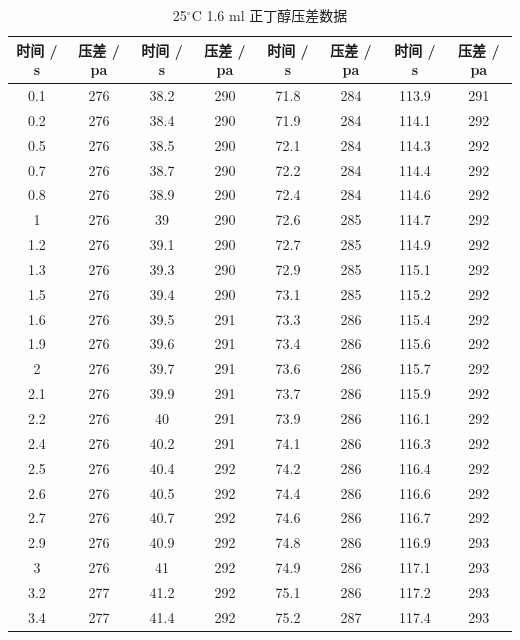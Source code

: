 \documentclass[12pt]{ctexart}
\numberwithin{equation}{section}
\begin{document}
\begin{longtable}{cc|cc|cc|cc}
    \caption{25$^\circ$C  1.6 ml 正丁醇压差数据} \\
    \hline
    时间 / s & 压差 / pa & 时间 / s & 压差 / pa & 时间 / s & 压差 / pa & 时间 / s & 压差 / pa \\
    \hline
    0.1  &  276  &  38.2  &  290  &  71.8  &  284  &  113.9  &  291  \\
0.2  &  276  &  38.4  &  290  &  71.9  &  284  &  114.1  &  292  \\
0.5  &  276  &  38.5  &  290  &  72.1  &  284  &  114.3  &  292  \\
0.7  &  276  &  38.7  &  290  &  72.2  &  284  &  114.4  &  292  \\
0.8  &  276  &  38.9  &  290  &  72.4  &  284  &  114.6  &  292  \\
1  &  276  &  39  &  290  &  72.6  &  285  &  114.7  &  292  \\
1.2  &  276  &  39.1  &  290  &  72.7  &  285  &  114.9  &  292  \\
1.3  &  276  &  39.3  &  290  &  72.9  &  285  &  115.1  &  292  \\
1.5  &  276  &  39.4  &  290  &  73.1  &  285  &  115.2  &  292  \\
1.6  &  276  &  39.5  &  291  &  73.3  &  286  &  115.4  &  292  \\
1.9  &  276  &  39.6  &  291  &  73.4  &  286  &  115.6  &  292  \\
2  &  276  &  39.7  &  291  &  73.6  &  286  &  115.7  &  292  \\
2.1  &  276  &  39.9  &  291  &  73.7  &  286  &  115.9  &  292  \\
2.2  &  276  &  40  &  291  &  73.9  &  286  &  116.1  &  292  \\
2.4  &  276  &  40.2  &  291  &  74.1  &  286  &  116.3  &  292  \\
2.5  &  276  &  40.4  &  292  &  74.2  &  286  &  116.4  &  292  \\
2.6  &  276  &  40.5  &  292  &  74.4  &  286  &  116.6  &  292  \\
2.7  &  276  &  40.7  &  292  &  74.6  &  286  &  116.7  &  292  \\
2.9  &  276  &  40.9  &  292  &  74.8  &  286  &  116.9  &  293  \\
3  &  276  &  41  &  292  &  74.9  &  286  &  117.1  &  293  \\
3.2  &  277  &  41.2  &  292  &  75.1  &  286  &  117.2  &  293  \\
3.4  &  277  &  41.4  &  292  &  75.2  &  287  &  117.4  &  293  \\

\end{longtable}
\end{document}
